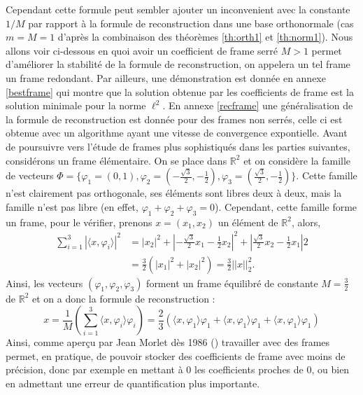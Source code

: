 Cependant cette formule peut sembler ajouter un inconvenient avec la constante $1/M$ par rapport à la formule de reconstruction dans une base orthonormale (cas $m=M=1$ d'après la combinaison des théorèmes \ref{th:orth1} et \ref{th:norm1}). 
Nous allons voir ci-dessous en quoi avoir un coefficient de frame serré $M>1$ permet d'améliorer la stabilité de la formule de reconstruction, on appelera un tel frame un frame redondant.
Par ailleurs, une démonstration est donnée en annexe \ref{bestframe} qui montre que la solution obtenue par les coefficients de frame est la solution minimale pour la norme $\ell^2$.
\newline
En annexe \ref{recframe} une généralisation de la formule de reconstruction est donnée pour des frames non serrés, celle ci est obtenue avec un algorithme ayant une vitesse de convergence expontielle.
\newline
Avant de poursuivre vers l'étude de frames plus sophistiqués dans les parties suivantes, considérons un frame élémentaire.
	On se place dans $\mathbb{R}^2$ et on considère la famille de vecteurs $\Phi= \{\varphi_1 = (0, 1), \varphi_2 = (-\frac{\sqrt{3}}{2}, -\frac{1}{2}), \varphi_3 =(\frac{\sqrt{3}}{2}, -\frac{1}{2})\}$.
	Cette famille n'est clairement pas orthogonale, ses éléments sont libres deux à deux, mais la famille n'est pas libre (en effet, $\varphi_1 +\varphi_2 +\varphi_3 = 0$).
	Cependant, cette famille forme un frame, pour le vérifier, prenons $x=(x_1, x_2)$ un élément de $\mathbb{R}^2$, alors,
	\begin{align*}
		\sum_{i=1}^3 |\langle x, \varphi_i \rangle|^2 &= |x_2|^2 + |-\frac{\sqrt{3}}{2}x_1 -\frac{1}{2} x_2|^2 + |\frac{\sqrt{3}}{2}x_2 - \frac{1}{2}x_1|2 \\
		&= \frac{3}{2}(|x_1|^2 + |x_2|^2) = \frac{3}{2} ||x||_2^2.
	\end{align*}
	Ainsi, les vecteurs $(\varphi_1, \varphi_2, \varphi_3)$ forment un frame équilibré de constante $M=\frac{3}{2}$ de $\mathbb{R}^2$ et on a donc la formule de reconstruction :
	\begin{equation}
		x = \frac{1}{M}( \sum_{i=1}^3 \langle x, \varphi_i \rangle \varphi_i) = \frac{2}{3}( \langle x, \varphi_1 \rangle \varphi_1 +  \langle x, \varphi_1 \rangle \varphi_1   + \langle x, \varphi_1 \rangle \varphi_1) 
	\end{equation}
Ainsi, comme aperçu par Jean Morlet dès 1986 (\cite{daubch3}) travailler avec des frames permet, en pratique, de pouvoir stocker des coefficients de frame avec moins de précision, donc par exemple en mettant à 0 les coefficients proches de 0, ou bien en admettant une erreur de quantification plus importante.
